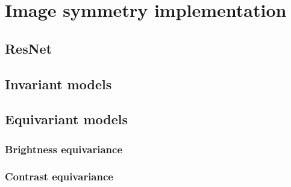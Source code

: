 \chapter{Image symmetry implementation}

\section{ResNet}
\section{Invariant models}
\section{Equivariant models}
    \subsection{Brightness equivariance}
    \subsection{Contrast equivariance}


